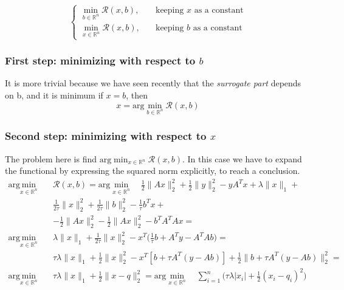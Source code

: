 $$\begin{cases}
    \min_{b\in \mathbb{R}^n } \mathcal{R}(x,b),& \quad \text{keeping $x$ as a constant} \\
    \min_{x \in \mathbb{R}^n} \mathcal{R}(x,b),&  \quad \text{keeping $b$ as a constant}
\end{cases}$$

\subsubsection{First step: minimizing with respect to $b$}
It is more trivial because we have seen recently that the \textit{surrogate part} depends on b, and it is minimum if $x=b$, then   
$$x=\textrm{arg}\min_{b \in \mathbb{R}^n} \mathcal{R}(x,b) $$

\subsubsection{Second step: minimizing with respect to $x$}
The problem here is find $\textrm{arg}\min_{x \in \mathbb{R}^n} \mathcal{R}(x,b)$. In this case we have to expand the functional by expressing the squared norm explicitly, to reach a conclusion. 
\begin{align}
\textrm{arg}\min_{x \in \mathbb{R}^n} \quad 
    &\mathcal{R}(x,b)=
    \textrm{arg}\min_{x \in \mathbb{R}^n} \quad 
    \frac{1}{2} \lVert Ax \rVert_2^2 +\frac{1}{2} \lVert y \rVert_2^2-yA^Tx+\lambda\lVert x \rVert_1+\\
    & \frac{1}{2\tau} \lVert x \rVert_2^2 + \frac{1}{2\tau} \lVert b \rVert_2^2-\frac{1}{\tau}b^Tx+\\
    &-\frac{1}{2}\lVert Ax \rVert_2^2 - \frac{1}{2}\lVert Ax \rVert_2^2 -b^TA^TAx = \\
    \label{eq: expanded}
    \textrm{arg}\min_{x \in \mathbb{R}^n} \quad 
    &\lambda \lVert x \rVert_1+\frac{1}{2\tau}\lVert x \rVert_2^2-x^T 
    \bigg( \frac{1}{\tau}b+A^Ty-A^TAb \bigg) =\\
    \label{eq:mult_tau}
    &\tau \lambda \lVert x \rVert_1 + \frac{1}{2} \lVert x \rVert_2^2 - x^T [b+\tau A^T(y-Ab)]+\frac{1}{2}\lVert b+\tau A^T(y-Ab) \rVert_2^2=\\
    \label{eq:final_step}
    \textrm{arg}\min_{x \in \mathbb{R}^n} \quad 
    &\tau\lambda\lVert x \rVert_1 + \frac{1}{2} \lVert x-q \rVert_2^2=
     \textrm{arg}\min_{x \in \mathbb{R}^n} \quad 
    \sum_{i=1}^{n} \bigg(\tau\lambda \lvert x_i \rvert + \frac{1}{2} (x_i-q_i)^2 \bigg)
\end{align}

